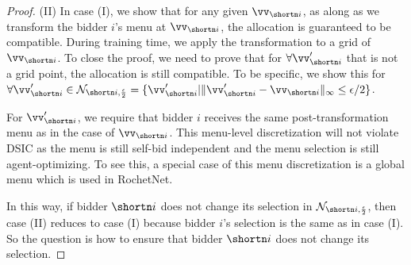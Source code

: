 \begin{proof}
(II) In case (I), we show that for any given $\vv_{\shortn i}$, as along as we transform the bidder $i$'s menu at $\vv_{\shortn i}$, the allocation is guaranteed to be compatible. During training time, we apply the transformation to a grid of $\vv_{\shortn i}$. To close the proof, we need to prove that for $\forall \vv'_{\shortn i}$ that is not a grid point, the allocation is still compatible. To be specific, we show this for $\forall \vv'_{\shortn i}\in \mathcal{N}_{\shortn i,\frac{\epsilon}{2}}=\{\vv_{\shortn i}' | \|\vv_{\shortn i}'-\vv_{\shortn i}\|_\infty\le \epsilon / 2\}$.

For $\vv'_{\shortn i}$, we require that bidder $i$ receives the same post-transformation menu as in the case of $\vv_{\shortn i}$. This menu-level discretization will not violate DSIC as the menu is still self-bid independent and the menu selection is still agent-optimizing. To see this, a special case of this menu discretization is a global menu which is used in RochetNet.

In this way, if bidder $\shortn i$ does not change its selection in $\mathcal{N}_{\shortn i,\frac{\epsilon}{2}}$, then case (II) reduces to case (I) because bidder $i$'s selection is the same as in case (I). So the question is how to ensure that bidder $\shortn i$ does not change its selection.


\end{proof}
